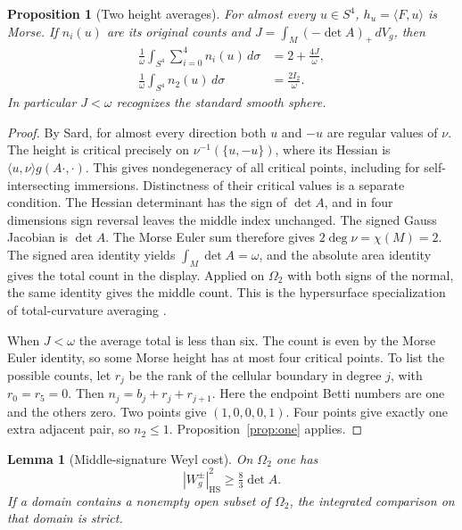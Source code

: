 \documentclass[11pt,letterpaper]{article}
\numberwithin{equation}{section}
\newtheorem{proposition}[theorem]{Proposition}
\newtheorem{lemma}[theorem]{Lemma}
\begin{document}
\begin{proposition}[Two height averages]\label{prop:averages}
For almost every \(u\in S^4\), \(h_u=\langle F,u\rangle\) is Morse.
If \(n_i(u)\) are its original counts and
\(J=\int_M(-\det A)_+\,dV_g\), then
\begin{align*}
 \frac1\omega\int_{S^4}\sum_{i=0}^4 n_i(u)\,d\sigma
       &=2+\frac{4J}{\omega},\\
 \frac1\omega\int_{S^4}n_2(u)\,d\sigma
       &=\frac{2I_2}{\omega}.
\end{align*}
In particular \(J<\omega\) recognizes the standard smooth sphere.
\end{proposition}

\begin{proof}
By Sard, for almost every direction both \(u\) and \(-u\) are
regular values of \(\nu\). The height is critical precisely on
\(\nu^{-1}(\{u,-u\})\), where its Hessian is
\(\langle u,\nu\rangle g(A\cdot,\cdot)\). This gives nondegeneracy
of all critical points, including for self-intersecting immersions.
Distinctness of their critical values is a separate condition.
The Hessian determinant has the
sign of \(\det A\), and in four dimensions sign reversal leaves the
middle index unchanged. The signed Gauss Jacobian is \(\det A\).
The Morse Euler sum therefore gives \(2\deg\nu=\chi(M)=2\).
The signed area identity yields \(\int_M\det A=\omega\), and
the absolute area identity gives the total count in the display.
Applied on \(\Omega_2\) with both signs of the normal, the same
identity gives the middle count. This is the hypersurface
specialization of total-curvature averaging
\cite{ChernLashof1957Curvature}.

When \(J<\omega\) the average total is less than six. The count
is even by the Morse Euler identity, so some Morse height has at
most four critical points. To list the possible counts, let \(r_j\)
be the rank of the cellular boundary in degree \(j\), with
\(r_0=r_5=0\). Then \(n_j=b_j+r_j+r_{j+1}\). Here the endpoint
Betti numbers are one and the others zero. Two points give
\((1,0,0,0,1)\). Four points give exactly one extra adjacent pair,
so \(n_2\leq1\). Proposition~\ref{prop:one} applies.
\end{proof}

\begin{lemma}[Middle-signature Weyl cost]\label{lem:weyl}
On \(\Omega_2\) one has
\[
 |W^\pm_g|_{\mathrm{HS}}^2\geq \tfrac83\det A.
\]
If a domain contains a nonempty open subset of \(\Omega_2\), the
integrated comparison on that domain is strict.
\end{lemma}
\end{document}
